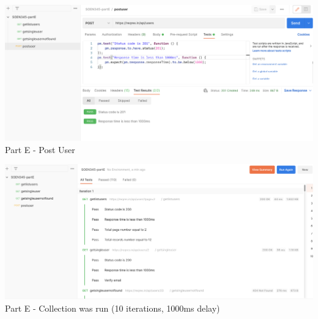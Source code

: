 \begin{center}
    \includegraphics[width=1\textwidth]{img/partE-4.png}
    \noindent Part E - Post User
\end{center}

\begin{center}
    \includegraphics[width=1\textwidth]{img/partE-sum.png}
    \noindent Part E - Collection was run (10 iterations, 1000ms delay)
\end{center}